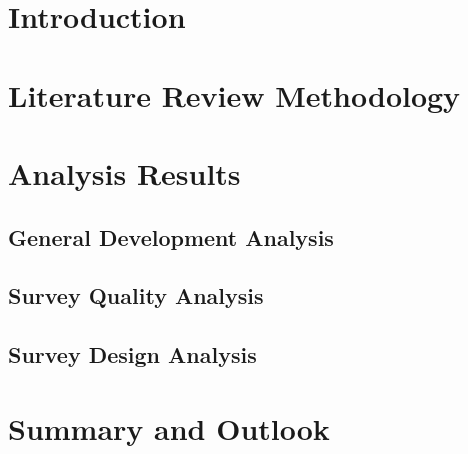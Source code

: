 \documentclass[12pt,a4paper]{article}
\begin{document}
\newpage



\section{Introduction}
\label{01_introduction}


\section{Literature Review Methodology}
\label{03_literature_review_methodology}


\section{Analysis Results}
\label{04_analysis_results}

\subsection{General Development Analysis}
\label{04_01_general_development_analysis}


\subsection{Survey Quality Analysis}
\label{04_02_survey_quality_analysis}


\subsection{Survey Design Analysis}
\label{04_04_survey_design_analysis}


\section{Summary and Outlook}
\label{05_summary_and_outlook}


\newpage
\printbibliography
\end{document}
